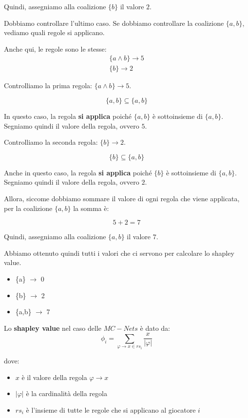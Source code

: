 Quindi, assegniamo alla coalizione $\{b\}$ il valore $2$.

\begin{esempio}

\end{esempio}

Dobbiamo controllare l'ultimo caso. Se dobbiamo controllare la coalizione $\{a,b\}$, vediamo quali regole si
applicano.

Anche qui, le regole sono le stesse:
\[
    \begin{aligned}
        \{a \land b\} \rightarrow 5 \\
        \{b\} \rightarrow 2
    \end{aligned}
\]

Controlliamo la prima regola: $\{a \land b\} \rightarrow 5$.

\[
    \{a,b\} \subseteq \{a,b\}
\]

In questo caso, la regola \textbf{si applica} poiché $\{a,b\}$ è sottoinsieme di
$\{a,b\}$. Segniamo quindi il valore della regola, ovvero $5$.

Controlliamo la seconda regola: $\{b\} \rightarrow 2$.

\[
    \{b\} \subseteq \{a,b\}
\]

Anche in questo caso, la regola \textbf{si applica} poiché $\{b\}$ è sottoinsieme di
$\{a,b\}$. Segniamo quindi il valore della regola, ovvero $2$.

Allora, siccome dobbiamo sommare il valore di ogni regola che viene applicata, per la coalizione $\{a,b\}$ la somma è:

\[
    5 + 2 = 7
\]

Quindi, assegniamo alla coalizione $\{a,b\}$ il valore $7$.

Abbiamo ottenuto quindi tutti i valori che ci servono per calcolare lo shapley value.

\begin{itemize}
    \item \{a\} $\rightarrow$ 0
    \item \{b\} $\rightarrow$ 2
    \item \{a,b\} $\rightarrow$ 7
\end{itemize}

Lo \textbf{shapley value} nel caso delle $MC-Nets$ è dato da:
\[
    \phi_i = \sum_{\varphi \rightarrow x \in rs_i} \frac{x}{|\varphi|}     
\]

dove:
\begin{itemize}
    \item $x$ è il valore della regola $\varphi \rightarrow x$
    \item $|\varphi|$ è la cardinalità della regola
    \item $rs_i$ è l'insieme di tutte le regole che si applicano al giocatore $i$
\end{itemize}


